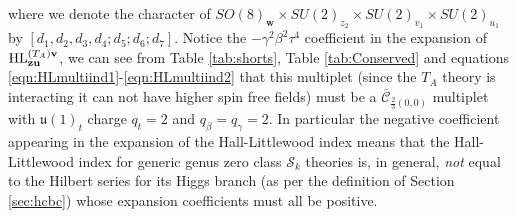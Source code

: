 \documentclass[main.tex]{subfiles}
\begin{document}
where we denote the character of $SO(8)_{\mathbf{w}}\times SU(2)_{z_2}\times SU(2)_{v_1}\times SU(2)_{u_1}$ by \newline$[d_1,d_2,d_3,d_4;d_5;d_6;d_7]$.
Notice the $-\gamma^2\beta^2\tau^4$ coefficient in the expansion of $\textrm{HL}^{(T_A)\mathbf{v}}_{\mathbf{z}\mathbf{u}}$, we can see from Table \ref{tab:shorts}, Table \ref{tab:Conserved} and equations \eqref{eqn:HLmultiind1}-\eqref{eqn:HLmultiind2} that this multiplet (since the $T_A$ theory is interacting it can not have higher spin free fields) must be a $\overline{\mathcal{C}}_{\frac{2}{3}(0,0)}$ multiplet with $\mathfrak{u}(1)_t$ charge $q_t=2$ and $q_{\beta}=q_{\gamma}=2$. In particular the negative coefficient appearing in the expansion of the Hall-Littlewood index means that the Hall-Littlewood index for generic genus zero class $\mathcal{S}_k$ theories is, in general, \textit{not} equal to the Hilbert series for its Higgs branch (as per the definition of Section \ref{sec:hcbc}) whose expansion coefficients must all be positive.  
\end{document}
